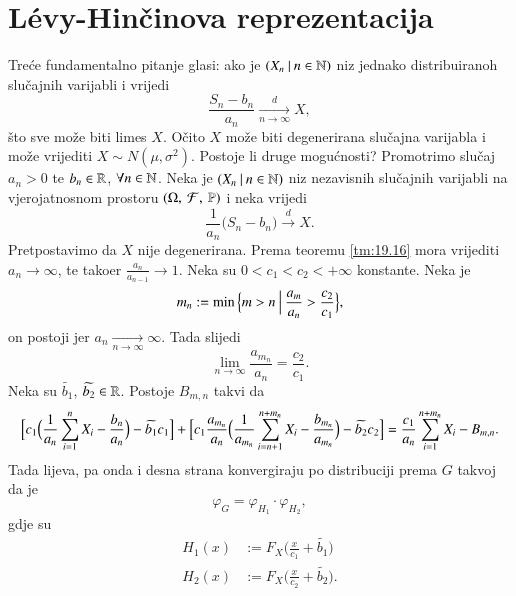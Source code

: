 
\chapter{L\' evy-Hin\v cinova reprezentacija}

Tre\' ce fundamentalno pitanje glasi: ako je $({X_n} \: | \: {n \in \mathbb{N}})$ niz jednako distribuiranoh slu\v cajnih varijabli i vrijedi
\begin{equation*}
    \frac{S_n - b_n}{a_n} \xrightarrow[n \to \infty]{d} X,
\end{equation*}
\v sto sve mo\v ze biti limes $X$.
O\v cito $X$ mo\v ze biti degenerirana slu\v cajna varijabla i mo\v ze vrijediti $X \sim N(\mu, \sigma^2)$.
Postoje li druge mogu\' cnosti?
Promotrimo slu\v caj $a_n > 0$ te $b_n \in \mathbb{R}$, $\forall n \in \mathbb{N}$.
Neka je $({X_n} \: | \: {n \in \mathbb{N}})$ niz nezavisnih slu\v cajnih varijabli na vjerojatnosnom prostoru $(\Omega, \: \mathcal{F}, \: \mathbb{P})$ i neka vrijedi
\begin{equation*}
    \frac{1}{a_n} \big( S_n - b_n \big) \xrightarrow{d} X.
\end{equation*} 
Pretpostavimo da $X$ nije degenerirana.
Prema teoremu \ref{tm:19.16} mora vrijediti $a_n \to \infty$, te tako\dj er $\frac{a_n}{a_{n - 1}} \to 1$.
Neka su $0 < c_1 < c_2 < +\infty$ konstante.
Neka je
\begin{equation*}
    m_n := \min \Big\{ {m > n} \: \Big| \: {\frac{a_m}{a_n} > \frac{c_2}{c_1}} \Big\},
\end{equation*}
on postoji jer $a_n \xrightarrow[n \to \infty]{} \infty$.
Tada slijedi
\begin{equation*}
    \lim\limits_{n \to \infty} \frac{a_{m_n}}{a_n} = \frac{c_2}{c_1}.
\end{equation*}
Neka su $\widetilde{b_1}$, $\widetilde{b_2} \in \mathbb{R}$.
Postoje $B_{m, n}$ takvi da
\begin{equation*}
    \Big[c_1 \Big( \frac{1}{a_n} \sum\limits_{i = 1}^{n} X_i - \frac{b_n}{a_n} \Big) - \widetilde{b_1} c_1 \Big]
    + \Big[ c_1 \frac{a_{m_n}}{a_n} \Big( \frac{1}{a_{m_n}} \sum\limits_{i = n + 1}^{n + m_n} X_i - \frac{b_{m_n}}{a_{m_n}} \Big) - \widetilde{b_2} c_2 \Big]
    = \frac{c_1}{a_n} \sum\limits_{i = 1}^{n + m_n} X_i - B_{m, n}.
\end{equation*}
Tada lijeva, pa onda i desna strana konvergiraju po distribuciji prema $G$ takvoj da je
\begin{equation*}
    \varphi_G = \varphi_{H_1} \cdot \varphi_{H_2},
\end{equation*}
gdje su
\begin{equation*}
    \begin{aligned}
        H_1 (x) &:= F_X \Big( \frac{x}{c_1} + \widetilde{b_1} \Big)\\
        H_2 (x) &:= F_X \Big( \frac{x}{c_2} + \widetilde{b_2} \Big).
    \end{aligned}
\end{equation*}